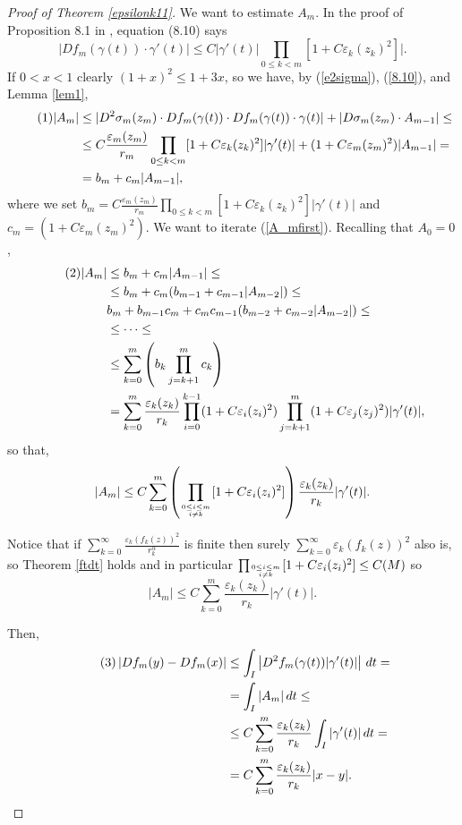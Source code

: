 \documentclass[11pt, twoside, leqno]{article}
\numberwithin{equation}{section}
\newcommand\numberthis{\addtocounter{equation}{1}\tag{\theequation}}
\theoremstyle{plain}
\theoremstyle{definition}
\newcommand{\e}{\varepsilon} %
\newcommand{\Atop}[2]{\genfrac{}{}{0pt}{}{#1}{#2}}
\begin{document}
\begin{proof}[Proof of Theorem \ref{epsilonk11}]
We want to estimate $A_m$. In the proof of Proposition 8.1 in \cite{davidtoro}, equation (8.10) says
\begin{equation} \label{8.10}
|Df_m(\gamma(t)) \cdot \gamma'(t)| \leq C |\gamma'(t)| \prod_{0 \leq k < m} [1+C \e_k(z_k)^2]|.
\end{equation}
If $0<x<1$ clearly $(1+x)^2\leq 1 + 3x$, so we have, by (\ref{e2sigma}), (\ref{8.10}), and Lemma \ref{lem1},
\begin{align*} \numberthis \label{A_mfirst}
|A_m| & \leq |D^2\sigma_m(z_m) \cdot Df_m(\gamma(t)) \cdot Df_m(\gamma(t)) \cdot \gamma(t)| + |D\sigma_m(z_m) \cdot A_{m-1}| \leq \\
& \leq C  \frac{\e_m(z_m)}{r_m} \prod_{0 \leq k < m} [1+C \e_k(z_k)^2]|\gamma'(t)|+ (1 + C  \e_m(z_m)^2)|A_{m-1}| = \\
& = b_m + c_m |A_{m-1}|,
\end{align*}
where we set $b_m=C\frac{\e_m(z_m)}{r_m} \prod_{0 \leq k < m} [1+C \e_k(z_k)^2]|\gamma'(t)|$ and $c_m=(1 + C  \e_m(z_m)^2)$.
We want to iterate (\ref{A_mfirst}). Recalling that $A_0=0$, 
\begin{align*} \numberthis
|A_m| & \leq b_m + c_m |A_{m-1}| \leq \\
& \leq b_m + c_m (b_{m-1} + c_{m-1}|A_{m-2}|) \leq \\
& b_m + b_{m-1}c_m + c_mc_{m-1}(b_{m-2}+c_{m-2}|A_{m-2}|) \leq \\
& \leq \dots \leq \\
& \leq \sum_{k=0}^{m} \left(b_k \prod_{j=k+1}^m c_k\right) \\
& = \sum_{k=0}^{m} \frac{\e_k(z_k)}{r_k} \prod_{i=0}^{k-1} (1+C \e_i(z_i)^2) \prod_{j=k+1}^m (1+C \e_j(z_j)^2)|\gamma'(t)|,
\end{align*}
so that,
\begin{equation} 
|A_m| \leq C \sum_{k=0}^m\left( \prod_{\Atop{0 \leq i \leq m}{i \neq k}}  [1+C \e_i(z_i)^2]\right)  \frac{\e_k(z_k)}{r_k}|\gamma'(t)|.
\end{equation}


Notice that if $\sum_{k=0}^{\infty} \frac{\e_k(f_k(z))^2}{r_k^{\alpha}}$ is finite then surely $\sum_{k=0}^{\infty} \e_k(f_k(z))^2$ also is, so Theorem \ref{ftdt} holds and in particular $\prod_{\Atop{0 \leq i \leq m}{i \neq k}}  [1+C \e_i(z_i)^2] \leq C(M)$ so
\begin{equation} \label{ambound}
|A_m| \leq C \sum_{k=0}^m \frac{ \e_k(z_k)}{r_k}|\gamma'(t)|.
\end{equation}

Then,
\begin{align*} \numberthis \label{lipbound}
\left|Df_m(y)-Df_m(x)\right| &  \leq \int_I \left|D^2f_m ( \gamma (t))|\gamma'(t)|\right|\,dt =\\
 & = \int_I |A_m|\,dt \leq \\
 & \leq C\sum_{k=0}^m  \frac{\e_k(z_k)}{r_k} \int_I |\gamma'(t)|\,dt= \\
 & = C\sum_{k=0}^m  \frac{\e_k(z_k)}{r_k}|x-y|.
\end{align*}


\end{proof}
\end{document}
